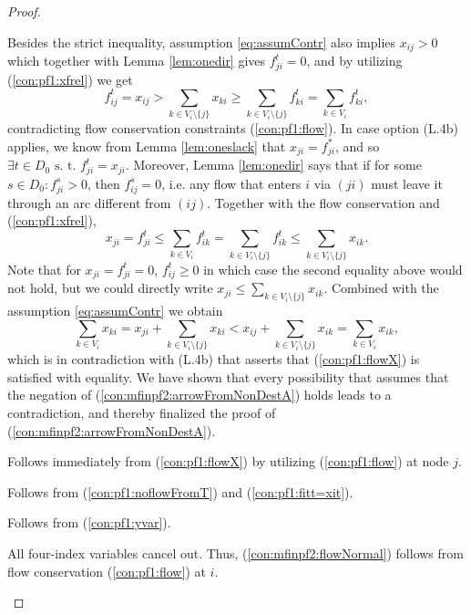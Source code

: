 \begin{proof}
\begin{itemize}[leftmargin=1cm]
Besides the strict inequality, assumption \ref{eq:assumContr} also implies $x_{ij}> 0$ which together with Lemma \ref{lem:onedir} gives $f^t_{ji}=0$, and by utilizing (\ref{con:pf1:xfrel}) we get
$$f^t_{ij}=x_{ij}>\sum\limits_{k \in V_i\setminus\{j\}}x_{ki} \geq \sum\limits_{k \in V_i\setminus\{j\}}f^t_{ki}=\sum\limits_{k \in V_i}f^t_{ki},$$
contradicting flow conservation constraints (\ref{con:pf1:flow}).
In case option (L.4b) applies, we know from Lemma \ref{lem:oneslack} that $x_{ji}=f^*_{ji}$, and so $\exists t\in D_0 \text{ s. t. }f^t_{ji}=x_{ji}$. Moreover, Lemma \ref{lem:onedir} says that if for some $s\in D_0: f^s_{ji}>0$, then $f^s_{ij} = 0$, i.e. any flow that enters $i$ via $(ji)$ must leave it through an arc different from $(ij)$. Together with the flow conservation and (\ref{con:pf1:xfrel}),
$$
x_{ji}=f^t_{ji}\leq\sum_{k\in V_i}f^t_{ik}=\sum_{k\in V_i\setminus\{j\}}f^t_{ik}\leq\sum_{k\in V_i\setminus\{j\}}x_{ik}.
$$
Note that for $x_{ji}=f^t_{ji}=0$, $f^t_{ij}\geq 0$ in which case the second equality above would not hold, but we could directly write $x_{ji}\leq\sum_{k\in V_i\setminus\{j\}}x_{ik}$. Combined with the assumption \ref{eq:assumContr} we obtain
$$
\sum_{k\in V_i}x_{ki} = x_{ji} + \sum_{k\in V_i\setminus\{j\}}x_{ki}<x_{ij} + \sum_{k\in V_i\setminus\{j\}}x_{ik} = \sum_{k\in V_i}x_{ik},
$$
which is in contradiction with (L.4b) that asserts that (\ref{con:pf1:flowX}) is satisfied with equality. We have shown that every possibility that assumes that the negation of (\ref{con:mfinpf2:arrowFromNonDestA}) holds leads to a contradiction, and thereby finalized the proof of (\ref{con:mfinpf2:arrowFromNonDestA}).
\item[ (\ref{con:mfinpf2:extraCon}):] Follows immediately from (\ref{con:pf1:flowX}) by utilizing (\ref{con:pf1:flow}) at node $j$.
\item[ (\ref{con:mfinpf2:startInSource}):] Follows from (\ref{con:pf1:noflowFromT}) and (\ref{con:pf1:fitt=xit}).
\item[ (\ref{con:mfinpf2:yvar}):] Follows from (\ref{con:pf1:yvar}).
{\indentitem\item[ (\ref{con:mfinpf2:flowNormal})-(\ref{con:mfinpf2:flowDest}):] All four-index variables cancel out. Thus, (\ref{con:mfinpf2:flowNormal}) follows from flow conservation (\ref{con:pf1:flow}) at $i$.}
\item[ (\ref{con:mfinpf2:zbound}):] %

\end{itemize}
\end{proof}

